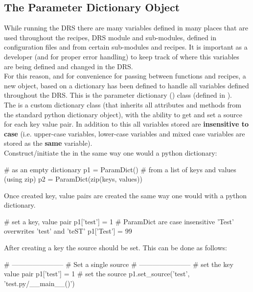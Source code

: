 \newpage

\subsection{The Parameter Dictionary Object}
\label{ch:rules:drs_specific:param_dict}

While running the DRS there are many variables defined in many places that are used throughout the recipes, DRS module and sub-modules, defined in configuration files and from certain sub-modules and recipes. It is important as a developer (and for proper error handling) to keep track of where this variables are being defined and changed in the DRS. \\

\noindent For this reason, and for convenience for passing between functions and recipes, a new object, based on a dictionary has been defined to handle all variables defined throughout the DRS. This is the parameter dictionary (\ParamDict) class (defined in \spirouConfig). \\

\noindent The \ParamDict is a custom dictionary class (that inherits all attributes and methods from the standard python dictionary object), with the ability to get and set a source for each key value pair. In addition to this all variables stored are \textbf{insensitive to case} (i.e. upper-case variables, lower-case variables and mixed case variables are stored as the \textbf{same} variable). \\

\noindent Construct/initiate the \ParamDict in the same way one would a python dictionary:
\begin{pythonbox}
# as an empty dictionary
p1 = ParamDict()
# from a list of keys and values (using zip)
p2 = ParamDict(zip(keys, values))
\end{pythonbox}

\noindent Once created key, value pairs are created the same way one would with a python dictionary.
\begin{pythonbox}
# set a key, value pair
p1['test'] = 1
# ParamDict are case insensitive 'Test' overwrites 'test' and 'teST' 
p1['Test'] = 99
\end{pythonbox}

\vspace{0.5cm}
\noindent After creating a key the source should be set. This can be done as follows:
\begin{pythonbox}
# -----------------------
# Set a single source
# -----------------------
# set the key value pair
p1['test'] = 1
# set the source
p1.set_source('test', 'test.py/__main__()')
\end{pythonbox}

